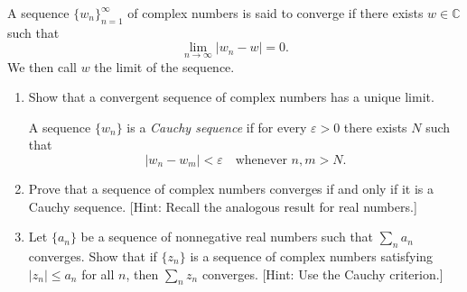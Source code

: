 \documentclass{../note}
\begin{document}
\begin{exercise}{3}
A sequence $\{w_n\}_{n=1}^\infty$ of complex numbers is said to converge if there exists $w \in \mathbb{C}$ such that
\[
\lim_{n \to \infty} |w_n - w| = 0.
\]
We then call $w$ the limit of the sequence.

\begin{enumerate}[label=(\alph*)]
\item Show that a convergent sequence of complex numbers has a unique limit.

A sequence $\{w_n\}$ is a \emph{Cauchy sequence} if for every $\varepsilon > 0$ there exists $N$ such that
\[
|w_n - w_m| < \varepsilon \quad \text{whenever } n,m > N.
\]
\item Prove that a sequence of complex numbers converges if and only if it is a Cauchy sequence. [Hint: Recall the analogous result for real numbers.]
\item Let $\{a_n\}$ be a sequence of nonnegative real numbers such that $\sum_n a_n$ converges.  
Show that if $\{z_n\}$ is a sequence of complex numbers satisfying $|z_n| \le a_n$ for all $n$, then $\sum_n z_n$ converges. [Hint: Use the Cauchy criterion.]
\end{enumerate}
\end{exercise}
\end{document}
